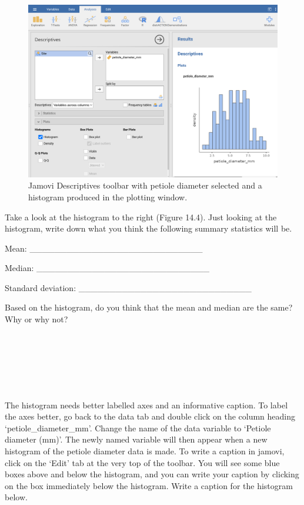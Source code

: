 \documentclass[
]{scrbook}
\begin{document}
\begin{figure}
\includegraphics[width=1\linewidth]{img/lilypad_histogram} \caption{Jamovi Descriptives toolbar with petiole diameter selected and a histogram produced in the plotting window.}\label{fig:unnamed-chunk-53}
\end{figure}

Take a look at the histogram to the right (Figure 14.4).
Just looking at the histogram, write down what you think the following summary statistics will be.

Mean: \_\_\_\_\_\_\_\_\_\_\_\_\_\_\_\_\_\_\_\_\_\_\_\_\_\_\_\_

Median: \_\_\_\_\_\_\_\_\_\_\_\_\_\_\_\_\_\_\_\_\_\_\_\_\_\_\_\_

Standard deviation: \_\_\_\_\_\_\_\_\_\_\_\_\_\_\_\_\_\_\_\_\_\_\_\_\_\_\_\_

Based on the histogram, do you think that the mean and median are the same? Why or why not?

\begin{verbatim}






\end{verbatim}

The histogram needs better labelled axes and an informative caption.
To label the axes better, go back to the data tab and double click on the column heading `petiole\_diameter\_mm'.
Change the name of the data variable to `Petiole diameter (mm)'.
The newly named variable will then appear when a new histogram of the petiole diameter data is made.
To write a caption in jamovi, click on the `Edit' tab at the very top of the toolbar.
You will see some blue boxes above and below the histogram, and you can write your caption by clicking on the box immediately below the histogram.
Write a caption for the histogram below.
\end{document}
